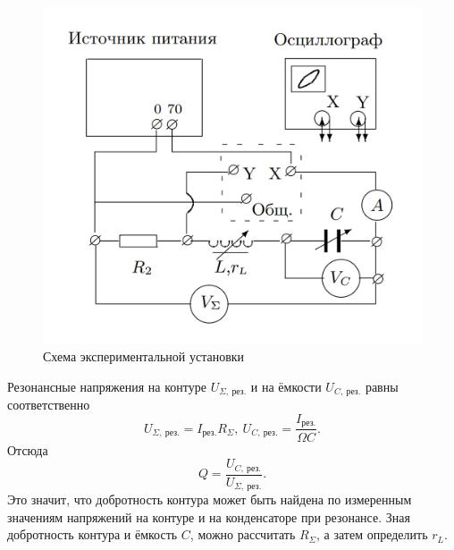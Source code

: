 \documentclass[a4paper, 12pt]{article}
\begin{document}
        \begin{figure}[ht]
            \centering
            \includegraphics[scale=0.35]{img/Device_2.png}
            \caption{Схема экспериментальной установки} \label{Device_2}
        \end{figure}

        Резонансные напряжения на контуре $U_{\Sigma,\ \text{рез.}}$ и на ёмкости $U_{C,\ \text{рез.}}$ равны соответственно\[U_{\Sigma,\ \text{рез.}}=I_{\text{рез.}}R_{\Sigma},\ U_{C,\ \text{рез.}}=\frac{I_{\text{рез.}}}{\Omega C}.\]Отсюда\[Q=\frac{U_{C,\ \text{рез.}}}{U_{\Sigma,\ \text{рез.}}}.\]Это значит, что добротность контура может быть найдена по измеренным значениям напряжений на контуре и на конденсаторе при резонансе. Зная добротность контура и ёмкость $C$, можно рассчитать $R_{\Sigma}$, а затем определить $r_L$.
\end{document}
